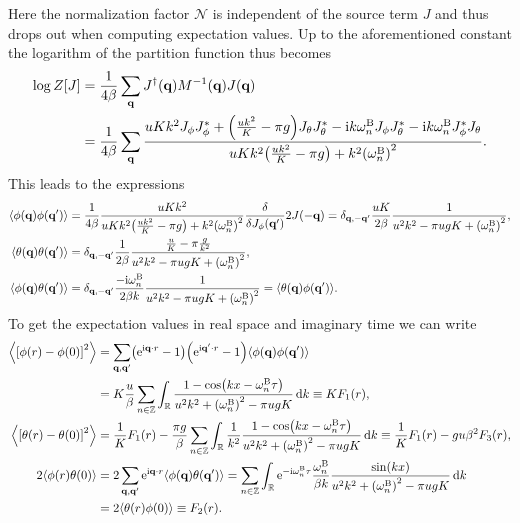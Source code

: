 \documentclass[english, parskip=full]{scrartcl}
\begin{document}
Here the normalization factor $\mathcal{N}$ is independent of the source term $J$ and thus drops out when computing expectation values.
Up to the aforementioned constant the logarithm of the partition function thus becomes
\begin{align}
\log Z[J] &= \frac{1}{4\beta} \sum_\textbf{q} J^\dagger(\textbf{q}) M^{-1}(\textbf{q}) J(\textbf{q}) \\
&= \frac{1}{4\beta} \sum_\textbf{q} \frac{uKk^2 J_\phi J_\phi^\ast + \kla*{\frac{uk^2}{K} - \pi g} J_\theta J_\theta^\ast - \i k\omega_n^\B J_\phi J_\theta^\ast - \i k\omega_n^\B J_\phi^\ast J_\theta}{uKk^2 \kla*{\frac{uk^2}{K} - \pi g} + k^2\kla*{\omega_n^\B}^2} .
\end{align}
This leads to the expressions
\begin{align}
\bra*{\phi(\textbf{q}) \phi(\textbf{q}')} &= \frac{1}{4\beta} \frac{uKk^2}{uKk^2 \kla*{\frac{uk^2}{K} - \pi g} + k^2\kla*{\omega_n^\B}^2} \frac{\delta }{\delta J_\phi(\textbf{q}')} 2J(-\textbf{q}) = \delta_{\textbf{q},-\textbf{q}'} \frac{uK}{2\beta} \frac{1}{u^2k^2 - \pi ugK + \kla*{\omega_n^\B}^2},\\
\bra*{\theta(\textbf{q}) \theta(\textbf{q}')} &= \delta_{\textbf{q},-\textbf{q}'} \frac{1}{2\beta} \frac{\frac{u}{K} - \pi \frac{g}{k^2}}{u^2k^2 - \pi ugK + \kla*{\omega_n^\B}^2},\\
\bra*{\phi(\textbf{q}) \theta(\textbf{q}')} &= \delta_{\textbf{q},-\textbf{q}'} \frac{-\i\omega_n^\B}{2\beta k} \frac{1}{u^2k^2 - \pi ugK + \kla*{\omega_n^\B}^2} = \bra*{\theta(\textbf{q}) \phi(\textbf{q}')}.
\end{align}
To get the expectation values in real space and imaginary time we can write
\begin{align}
\bra*{\klb*{\phi(r) - \phi(0)}^2} &= \sum_{\textbf{q},\textbf{q}'} \kla*{\powe{\i \textbf{q}\cdot r} - 1} \kla*{\powe{\i \textbf{q}'\cdot r} - 1} \bra*{\phi(\textbf{q}) \phi(\textbf{q}')} \\
&= K \frac{u}{\beta} \sum_{n\in\mathbb{Z}} \intr{\frac{1 - \cos\kla*{kx - \omega_n^\B \tau}}{u^2k^2 + \kla*{\omega_n^\B}^2 - \pi ugK}}{k} \equiv KF_1(r),\\
\bra*{\klb*{\theta(r) - \theta(0)}^2} &= \frac{1}{K}F_1(r) - \frac{\pi g}{\beta} \sum_{n\in\mathbb{Z}} \intr{ \frac{1}{k^2} \frac{1 - \cos\kla*{kx - \omega_n^\B \tau}}{u^2k^2 + \kla*{\omega_n^\B}^2 - \pi ugK}}{k} \equiv \frac{1}{K} F_1(r) - gu\beta^2 F_3(r),\\
2\bra*{\phi(r)\theta(0)} &= 2\sum_{\textbf{q},\textbf{q}'} \powe{\i \textbf{q}\cdot r} \bra*{\phi(\textbf{q})\theta(\textbf{q}')} = \sum_{n\in\mathbb{Z}} \intr{\powe{-\i\omega_n^\B\tau} \frac{\omega_n^\B}{\beta k} \frac{\sin(kx)}{u^2k^2 + \kla*{\omega_n^\B}^2 - \pi ugK}}{k} \\
&= 2\bra*{\theta(r) \phi(0)} \equiv F_2(r).
\end{align}
\end{document}
